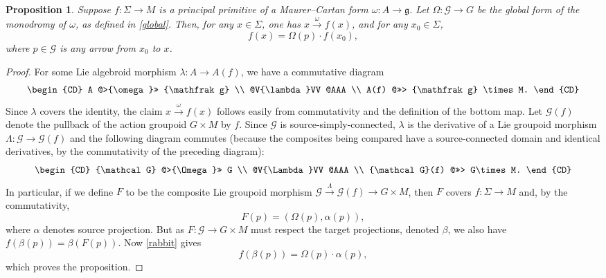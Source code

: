 \documentclass[pdftex]{sigma}%
\numberwithin{equation}{section}
\newtheorem{Proposition}[Theorem]{Proposition}
\begin{document}
\begin{Proposition}\label{uniquenessP}
 Suppose $f \colon \Sigma \rightarrow M$ is a principal primitive of
 a Maurer--Cartan form $\omega \colon A \rightarrow {\mathfrak g} $.
 Let $\Omega \colon {\mathcal G} \rightarrow G$ be the global form of
 the monodromy of $\omega $, as defined in \eqref{global}. Then, for
 any $x \in \Sigma $, one has $x\xrightarrow{\omega}f(x)$, and for
 any $x_0\in \Sigma $,
 \begin{equation*} f(x)=\Omega(p)\cdot f(x_0),
 \end{equation*} where $p \in {\mathcal G} $ is any arrow from $x_0$
to $x$.
\end{Proposition}
\begin{proof} For some Lie algebroid morphism $\lambda \colon A
\rightarrow A(f)$, we have a commutative diagram
 \begin{equation*}
 \begin{CD} A @>{\omega }>> {\mathfrak g} \\ @V{\lambda}VV @AAA \\
A(f) @>>> {\mathfrak g} \times M.
 \end{CD}
 \end{equation*}
 Since $\lambda$ covers the identity, the claim
$x\xrightarrow{\omega}f(x)$ follows easily from commutativity and the
definition of the bottom map. Let ${\mathcal G}(f)$ denote the
pullback of the action groupoid $G \times M$ by $f$. Since ${\mathcal
G} $ is source-simply-connected, $\lambda$ is the derivative of a Lie
groupoid morphism $\Lambda \colon {\mathcal G} \rightarrow {\mathcal
G}(f)$ and the following diagram commutes (because the composites
being compared have a source-connected domain and identical
derivatives, by the commutativity of the preceding diagram):
 \begin{equation*}
 \begin{CD} {\mathcal G} @>{\Omega }>> G \\ @V{\Lambda}VV @AAA \\
{\mathcal G}(f) @>>> G\times M.
 \end{CD}
 \end{equation*}
 In particular, if we define $F$ to be the composite
Lie groupoid morphism ${\mathcal G}\xrightarrow{\Lambda}{\mathcal
G}(f)\rightarrow G \times M$, then $F$ covers $f \colon \Sigma
\rightarrow M$ and, by the commutativity,
\begin{equation}
F(p)=(\Omega(p),\alpha(p)),\label{rabbit}
\end{equation} where $\alpha $ denotes source projection. But as $F
\colon {\mathcal G} \rightarrow G \times M$ must respect the target
projections, denoted $\beta$, we also have
$f(\beta(p))=\beta(F(p))$. Now \eqref{rabbit} gives
\begin{equation*} f(\beta(p))=\Omega(p) \cdot \alpha(p),
\end{equation*} which proves the proposition.
\end{proof}
\end{document}

